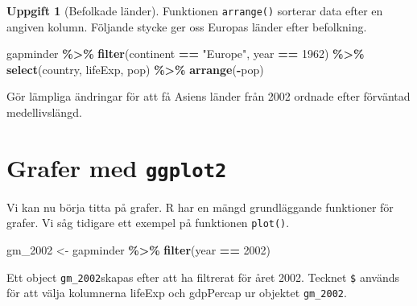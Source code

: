 \documentclass[
]{book}
\newenvironment{Shaded}{\begin{snugshade}}{\end{snugshade}}
\newcommand{\DecValTok}[1]{\textcolor[rgb]{0.00,0.00,0.81}{#1}}
\newcommand{\FunctionTok}[1]{\textcolor[rgb]{0.13,0.29,0.53}{\textbf{#1}}}
\newcommand{\NormalTok}[1]{#1}
\newcommand{\OtherTok}[1]{\textcolor[rgb]{0.56,0.35,0.01}{#1}}
\newcommand{\SpecialCharTok}[1]{\textcolor[rgb]{0.81,0.36,0.00}{\textbf{#1}}}
\newcommand{\StringTok}[1]{\textcolor[rgb]{0.31,0.60,0.02}{#1}}
\theoremstyle{definition}
\theoremstyle{definition}
\theoremstyle{definition}
\newtheorem{exercise}{Uppgift}[chapter]
\theoremstyle{definition}
\theoremstyle{remark}
\begin{document}
\begin{exercise}[Befolkade länder]
Funktionen \texttt{arrange()} sorterar data efter en angiven kolumn. Följande stycke ger oss Europas länder efter befolkning.

\begin{Shaded}
\begin{Highlighting}[]
\NormalTok{gapminder }\SpecialCharTok{\%\textgreater{}\%}                                    
  \FunctionTok{filter}\NormalTok{(continent }\SpecialCharTok{==} \StringTok{"Europe"}\NormalTok{, year }\SpecialCharTok{==} \DecValTok{1962}\NormalTok{) }\SpecialCharTok{\%\textgreater{}\%}
  \FunctionTok{select}\NormalTok{(country, lifeExp, pop) }\SpecialCharTok{\%\textgreater{}\%}
  \FunctionTok{arrange}\NormalTok{(}\SpecialCharTok{{-}}\NormalTok{pop)                                   }
\end{Highlighting}
\end{Shaded}

Gör lämpliga ändringar för att få Asiens länder från 2002 ordnade efter förväntad medellivslängd.
\end{exercise}

\section{\texorpdfstring{Grafer med \texttt{ggplot2}}{Grafer med ggplot2}}\label{grafer-med-ggplot2}

Vi kan nu börja titta på grafer. R har en mängd grundläggande funktioner för grafer. Vi såg tidigare ett exempel på funktionen \texttt{plot()}.

\begin{Shaded}
\begin{Highlighting}[]
\NormalTok{gm\_2002 }\OtherTok{\textless{}{-}}\NormalTok{ gapminder }\SpecialCharTok{\%\textgreater{}\%} \FunctionTok{filter}\NormalTok{(year }\SpecialCharTok{==} \DecValTok{2002}\NormalTok{)}
\end{Highlighting}
\end{Shaded}

\begin{Shaded}
\end{Shaded}

Ett object \texttt{gm\_2002}skapas efter att ha filtrerat för året 2002. Tecknet \texttt{\$} används för att välja kolumnerna lifeExp och gdpPercap ur objektet \texttt{gm\_2002}.
\end{document}
